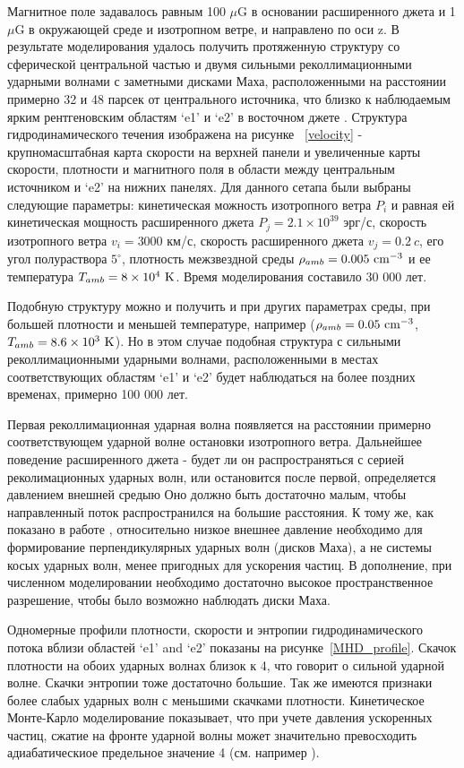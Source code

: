 Магнитное поле задавалось равным 100 $\mu$G в основании расширенного джета и 1 $\mu$G в окружающей среде и изотропном ветре, и направлено по оси z. В результате моделирования удалось получить протяженную структуру со сферической центральной частью и двумя сильными реколлимационными ударными волнами с заметными дисками Маха, расположенными на расстоянии примерно 32 и 48 парсек от центрального источника, что близко к наблюдаемым ярким рентгеновским областям `e1' и `e2' в восточном джете \cite{Safi-Harb1997}. Структура гидродинамического течения изображена на рисунке ~\ref{velocity} - крупномасштабная карта скорости на верхней панели и увеличенные карты скорости, плотности и магнитного поля в области между центральным источником и `e2' на нижних панелях. Для данного сетапа были выбраны следующие параметры: кинетическая можность изотропного ветра $P_i$ и равная ей кинетическая мощность расширенного джета $P_j = 2.1\times10^{39}$ эрг/с, скорость изотропного ветра  $v_i=3000$ км/с, скорость расширенного джета $v_j=0.2~c$, его угол полураствора $5^{\circ}$, плотность межзвездной среды $\rho_{amb} = 0.005~\rm{cm^{-3}}$ и ее температура $T_{amb} = 8\times10^4~\rm{K}$. Время моделирования составило 30 000 лет.

Подобную структуру можно и получить и при других параметрах среды, при большей плотности и меньшей температуре, например
 ($\rho_{amb}=0.05~\rm{cm^{-3}}$, $T_{amb} = 8.6\times10^3~\rm{K}$). Но в этом случае подобная структура с сильными реколлимационными ударными волнами, расположенными в местах соответствующих областям `e1' и `e2' будет наблюдаться на более поздних временах, примерно 100 000 лет. 

Первая реколлимационная ударная волна появляется на расстоянии примерно соответствующем ударной волне остановки изотропного ветра. Дальнейшее поведение расширенного джета - будет ли он распространяться с серией реколимационных ударных волн, или остановится после первой, определяется давлением внешней средыю Оно должно быть достаточно малым, чтобы направленный поток распространился на большие расстояния. К тому же, как показано в работе \cite{Marti2018}, относительно низкое внешнее давление необходимо для формирование перпендикулярных ударных волн (дисков Маха), а не системы косых ударных волн, менее пригодных для ускорения частиц. В дополнение, при численном моделировании необходимо достаточно высокое пространственное разрешение, чтобы было возможно наблюдать диски Маха.

Одномерные профили плотности, скорости и энтропии гидродинамического потока вблизи областей `e1' and `e2' показаны на рисунке~\ref{MHD_profile}. Скачок плотности на обоих ударных волнах близок к 4, что говорит о сильной ударной волне. Скачки энтропии тоже достаточно большие. Так же имеются признаки более слабых ударных волн с меньшими скачками плотности. Кинетическое Монте-Карло моделирование показывает, что при учете давления ускоренных частиц, сжатие на фронте ударной волны может значительно превосходить адиабатическиое предельное значение 4 (см. например \cite{Bykov3inst2014}).

